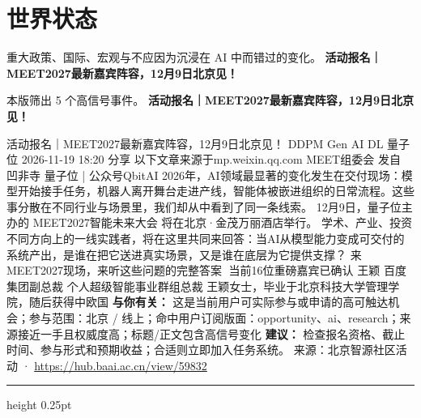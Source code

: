 \documentclass[10.5pt]{ctexart}
\begin{document}
\section*{世界状态}
{\color{ormuted} 重大政策、国际、宏观与不应因为沉浸在 AI 中而错过的变化。}
\vspace{2mm}
{\LARGE\bfseries 活动报名｜MEET2027最新嘉宾阵容，12月9日北京见！}\par
\vspace{1mm}
{\color{ormuted} 本版筛出 5 个高信号事件。}
\vspace{3mm}
{\Large\bfseries 活动报名｜MEET2027最新嘉宾阵容，12月9日北京见！}\par
活动报名｜MEET2027最新嘉宾阵容，12月9日北京见！ DDPM Gen AI DL 量子位 2026-11-19 18:20 分享 以下文章来源于mp.weixin.qq.com MEET组委会 发自 凹非寺 量子位 | 公众号QbitAI 2026年，AI领域最显著的变化发生在交付现场：模型开始接手任务，机器人离开舞台走进产线，智能体被嵌进组织的日常流程。这些事分散在不同行业与场景里，我们却从中看到了同一条线索。 12月9日，量子位主办的 MEET2027智能未来大会 将在北京·金茂万丽酒店举行。 学术、产业、投资 不同方向上的一线实践者，将在这里共同来回答：当AI从模型能力变成可交付的系统产出，是谁在把它送进真实场景，又是谁在底层为它提供支撑？ 来MEET2027现场，来听这些问题的完整答案🔽 当前16位重磅嘉宾已确认 王颖 百度集团副总裁 个人超级智能事业群组总裁 王颖女士，毕业于北京科技大学管理学院，随后获得中欧国
\textbf{与你有关：} 这是当前用户可实际参与或申请的高可触达机会；参与范围：北京 / 线上；命中用户订阅版面：opportunity、ai、research；来源接近一手且权威度高；标题/正文包含高信号变化
\textbf{建议：} 检查报名资格、截止时间、参与形式和预期收益；合适则立即加入任务系统。
{\footnotesize\color{ormuted} 来源：北京智源社区活动 · \url{https://hub.baai.ac.cn/view/59832}}
\vspace{4mm}
\hrule height 0.25pt
\vspace{3mm}
\end{document}
